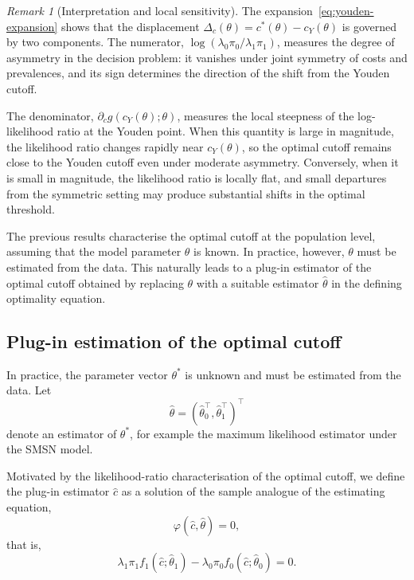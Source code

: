\documentclass[11pt,a4paper]{article}
\theoremstyle{definition}
\theoremstyle{remark}
\newtheorem{remark}[theorem]{Remark}
\newcommand{\1}{\mathbf{1}}
\begin{document}
\begin{remark}[Interpretation and local sensitivity]
\label{rem:youden-interpretation}
\normalfont
The expansion~\eqref{eq:youden-expansion} shows that the
displacement $\Delta_c(\theta)=c^*(\theta)-c_Y(\theta)$ is
governed by two components. The numerator,
$\log(\lambda_0\pi_0/\lambda_1\pi_1)$, measures the degree of
asymmetry in the decision problem: it vanishes under joint
symmetry of costs and prevalences, and its sign determines the
direction of the shift from the Youden cutoff.

The denominator, $\partial_c g(c_Y(\theta);\theta)$, measures
the local steepness of the log-likelihood ratio at the Youden
point. When this quantity is large in magnitude, the
likelihood ratio changes rapidly near $c_Y(\theta)$, so the
optimal cutoff remains close to the Youden cutoff even under
moderate asymmetry. Conversely, when it is small in magnitude,
the likelihood ratio is locally flat, and small departures from
the symmetric setting may produce substantial shifts in the
optimal threshold.
\end{remark}

The previous results characterise the optimal cutoff at the
population level, assuming that the model parameter $\theta$ is
known. In practice, however, $\theta$ must be estimated from the
data. This naturally leads to a plug-in estimator of the
optimal cutoff obtained by replacing $\theta$ with a suitable
estimator $\hat\theta$ in the defining optimality equation.

\subsection{Plug-in estimation of the optimal cutoff}

In practice, the parameter vector $\theta^*$ is unknown and must
be estimated from the data. Let
\[
\hat\theta=(\hat\theta_0^\top,\hat\theta_1^\top)^\top
\]
denote an estimator of $\theta^*$, for example the maximum
likelihood estimator under the SMSN model.

Motivated by the likelihood-ratio characterisation of the
optimal cutoff, we define the plug-in estimator $\hat c$ as a
solution of the sample analogue of the estimating equation,
\begin{equation*}
\label{eq:plugin}
\varphi(\hat c,\hat\theta)=0,
\end{equation*}
that is,
\begin{equation}
\label{eq:estimated-eq}
\lambda_1\pi_1 f_1(\hat c;\hat\theta_1)
-
\lambda_0\pi_0 f_0(\hat c;\hat\theta_0)
=0.
\end{equation}
\end{document}
